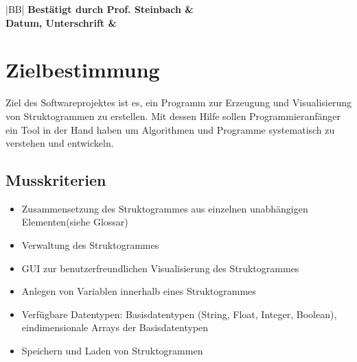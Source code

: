 \documentclass[a4paper,10pt]{report}
\begin{document}
\begin{titlepage}
\begin{tabular}{|c|l|l|l|l|}
\end{tabular}

\vspace{10mm}

\begin{center}
\begin{tabular}{|BB|}
\hline
\bfseries \large Best\"{a}tigt durch Prof. Steinbach & \quad \quad \quad \quad \quad \quad \quad \quad \quad \\
\bfseries \large Datum, Unterschrift &
\\
\hline
\end{tabular}
\end{center}

\end{titlepage}

\newpage
\renewcommand{\thesection}{\arabic{section}}

\tableofcontents
\newpage

\section{Zielbestimmung}
Ziel des Softwareprojektes ist es, ein Programm zur Erzeugung und Visualisierung von Struktogrammen zu erstellen. 
Mit dessen Hilfe sollen Programmieranf\"{a}nger ein Tool in der Hand haben um Algorithmen und Programme systematisch zu verstehen und entwickeln.

\subsection{Musskriterien}
\begin{itemize}

\item Zusammensetzung des Struktogrammes aus einzelnen unabhängigen Elementen(siehe Glossar)
\item Verwaltung des Struktogrammes
\item GUI zur benutzerfreundlichen Visualisierung des Struktogrammes
\item Anlegen von Variablen innerhalb eines Struktogrammes
\item Verfügbare Datentypen: Basisdatentypen (String, Float, Integer, Boolean), eindimensionale Arrays der Basisdatentypen
\item Speichern und Laden von Struktogrammen


\end{itemize}
\end{document}
